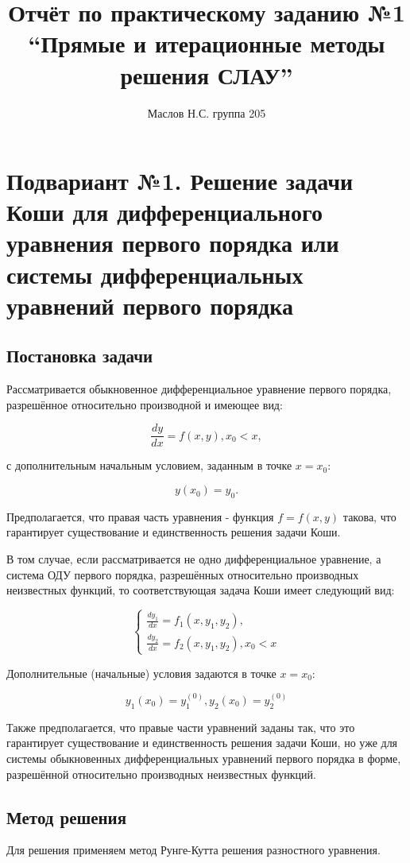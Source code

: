 \documentclass[a4paper,11pt]{report}
\title{Отчёт по практическому заданию №1 ``Прямые и итерационные методы решения СЛАУ''}
\author{Маслов Н.С. группа 205}
\begin{document}



\section*{Подвариант №1. Решение задачи Коши для дифференциального уравнения первого порядка или системы дифференциальных
уравнений первого порядка}

\subsection*{Постановка задачи}

Рассматривается обыкновенное дифференциальное уравнение первого порядка, разрешённое относительно производной и имеющее вид:

$$ 
\frac{dy}{dx} = f(x, y), x_0 < x,
$$

с дополнительным начальным условием, заданным в точке $x = x_0$:

$$
y(x_0) = y_0.
$$

Предполагается, что правая часть уравнения - функция $f = f(x, y)$ такова, что гарантирует существование и единственность решения
задачи Коши.

В том случае, если рассматривается не одно дифференциальное уравнение, а система ОДУ первого порядка, разрешённых относительно
производных неизвестных функций, то соответствующая задача Коши имеет следующий вид:

$$
\begin{cases}
 \frac{dy_1}{dx} = f_1(x, y_1, y_2), \\
 \frac{dy_2}{dx} = f_2(x, y_1, y_2), x_0 < x
\end{cases}
$$

Дополнительные (начальные) условия задаются в точке $x = x_0$:

$$
y_1(x_0) = y_1^{(0)}, y_2(x_0) = y_2^{(0)}
$$

Также предполагается, что правые части уравнений заданы так, что это гарантирует существование и единственность решения задачи Коши, но
уже для системы обыкновенных дифференциальных уравнений первого порядка в форме, разрешённой относительно производных неизвестных 
функций.

\subsection*{Метод решения}

Для решения применяем метод Рунге-Кутта решения разностного уравнения.
\end{document}
